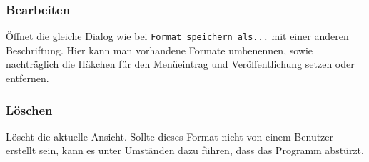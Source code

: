 \subsubsection{Bearbeiten}

Öffnet die gleiche Dialog wie bei \texttt{Format speichern als...} mit einer anderen Beschriftung. Hier kann man vorhandene Formate umbenennen, sowie nachträglich die Häkchen für den Menüeintrag und Veröffentlichung setzen oder entfernen.

\subsubsection{Löschen}

Löscht die aktuelle Ansicht. Sollte dieses Format nicht von einem Benutzer erstellt sein, kann es unter Umständen dazu führen, dass das Programm abstürzt.
 
